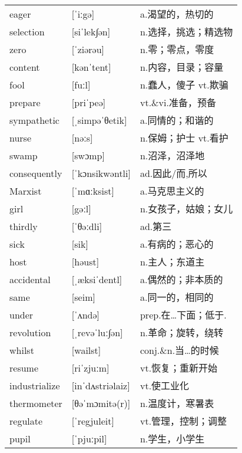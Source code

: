 \documentclass[a4paper]{article}
\begin{document}
\section{}
\begin{tabular}{l l l}

eager & [ˈiːgə] & a.渴望的，热切的 \\
selection & [siˈlek∫ən] & n.选择，挑选；精选物 \\
zero & [ˈziərəu] & n.零；零点，零度 \\
content & [kənˈtent] & n.内容，目录；容量 \\
fool & [fuːl] & n.蠢人，傻子 vt.欺骗 \\
prepare & [priˈpeə] & vt.\&vi.准备，预备 \\
sympathetic & [ˌsimpəˈθetik] & a.同情的；和谐的 \\
nurse & [nəːs] & n.保姆；护士 vt.看护 \\
swamp & [swɔmp] & n.沼泽，沼泽地 \\
consequently & [ˈkɔnsikwəntli] & ad.因此/而,所以 \\
Marxist & [ˈmɑːksist] & a.马克思主义的 \\
girl & [gəːl] & n.女孩子，姑娘；女儿 \\
thirdly & [ˈθəːdli] & ad.第三 \\
sick & [sik] & a.有病的；恶心的 \\
host & [həust] & n.主人；东道主 \\
accidental & [ˌæksiˈdentl] & a.偶然的；非本质的 \\
same & [seim] & a.同一的，相同的 \\
under & [ˈʌndə] & prep.在…下面；低于. \\
revolution & [ˌrevəˈluː∫ən] & n.革命；旋转，绕转 \\
whilst & [wailst] & conj.\&n.当…的时候 \\
resume & [riˈzjuːm] & vt.恢复；重新开始 \\
industrialize & [inˈdʌstriəlaiz] & vt.使工业化 \\
thermometer & [θəˈmɔmitə(r)] & n.温度计，寒暑表 \\
regulate & [ˈregjuleit] & vt.管理，控制；调整 \\
pupil & [ˈpjuːpil] & n.学生，小学生 \\

\end{tabular}
\end{document}
